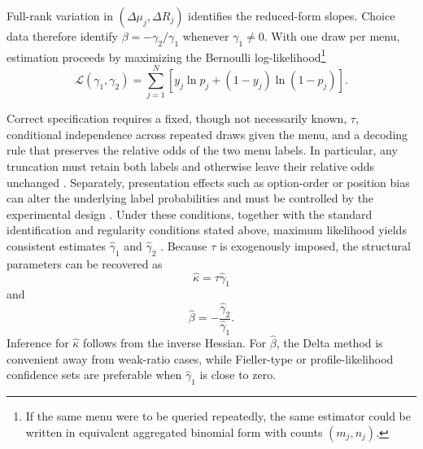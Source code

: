 Full-rank variation in $(\Delta \mu_j,\Delta R_j)$ identifies the reduced-form slopes. Choice data therefore identify $\beta = -\gamma_2/\gamma_1$ whenever $\gamma_1 \neq 0$. With one draw per menu, estimation proceeds by maximizing the Bernoulli log-likelihood\footnote{If the same menu were to be queried repeatedly, the same estimator could be written in equivalent aggregated binomial form with counts $(m_j,n_j)$.}
\begin{equation}\label{eq:log-likelihood}
  \mathcal{L}(\gamma_1, \gamma_2)
  = \sum_{j=1}^N
  \left[
    y_j \ln p_j
    + (1-y_j)\ln(1-p_j)
  \right].
\end{equation}

Correct specification requires a fixed, though not necessarily known, $\tau$, conditional independence across repeated draws given the menu, and a decoding rule that preserves the relative odds of the two menu labels. In particular, any truncation must retain both labels and otherwise leave their relative odds unchanged \citep{mcfadden1972conditional,train2009discrete}. Separately, presentation effects such as option-order or position bias can alter the underlying label probabilities and must be controlled by the experimental design \citep{pezeshkpour2024large}. Under these conditions, together with the standard identification and regularity conditions stated above, maximum likelihood yields consistent estimates $\hat{\gamma}_1$ and $\hat{\gamma}_2$ \citep{newey1994large}. Because $\tau$ is exogenously imposed, the structural parameters can be recovered as
\begin{equation}\label{eq:revealed-kappa}
  \hat{\kappa} = \tau \hat{\gamma}_1
\end{equation}
and
\begin{equation}\label{eq:beta-mle}
  \hat{\beta} = -\frac{\hat{\gamma}_2}{\hat{\gamma}_1}.
\end{equation}
Inference for $\hat{\kappa}$ follows from the inverse Hessian. For $\hat{\beta}$, the Delta method is convenient away from weak-ratio cases, while Fieller-type or profile-likelihood confidence sets are preferable when $\hat{\gamma}_1$ is close to zero.
